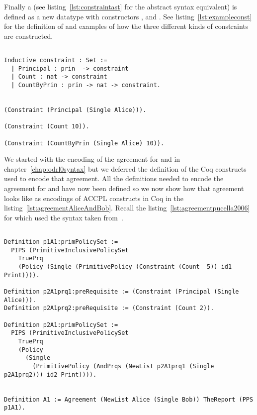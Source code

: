 Finally a  (see  listing~\ref{lst:constraintast} for the abstract syntax equivalent) is defined as a new datatype with constructors ,  and . See listing~\ref{lst:exampleconst} for the definition of  and examples of how the three different kinds of constraints are constructed.

\lstset{language=Coq}
\begin{minipage}[c]{0.95\textwidth}
\begin{lstlisting}[frame=single, caption={Constraint Definition and the Three Kinds of Constraints},label={lst:exampleconst}]

Inductive constraint : Set :=
  | Principal : prin  -> constraint 
  | Count : nat -> constraint 
  | CountByPrin : prin -> nat -> constraint.


(Constraint (Principal (Single Alice))).

(Constraint (Count 10)).

(Constraint (CountByPrin (Single Alice) 10)).

\end{lstlisting}
\end{minipage}


We started with the encoding of the agreement for  and  in chapter~\ref{chap:odrl0syntax} but we deferred the definition of the Coq constructs used to encode that agreement. All the definitions needed to encode the agreement for  and  have now been defined so we now show how that agreement looks like as encodings of \ac{ACCPL} constructs in Coq in the listing~\ref{lst:agreementAliceAndBob}. Recall the listing~\ref{lst:agreementpucella2006} for  which used the syntax taken from~\cite{pucella2006}.



\lstset{language=Coq}
\begin{lstlisting}[frame=single, caption={Agreement for Alice and Bob in ACCPL},label={lst:agreementAliceAndBob}]

Definition p1A1:primPolicySet :=
  PIPS (PrimitiveInclusivePolicySet
    TruePrq
    (Policy (Single (PrimitivePolicy (Constraint (Count  5)) id1 Print)))).

Definition p2A1prq1:preRequisite := (Constraint (Principal (Single Alice))).
Definition p2A1prq2:preRequisite := (Constraint (Count 2)).

Definition p2A1:primPolicySet :=
  PIPS (PrimitiveInclusivePolicySet
    TruePrq
    (Policy 
      (Single 
        (PrimitivePolicy (AndPrqs (NewList p2A1prq1 (Single p2A1prq2))) id2 Print)))).


Definition A1 := Agreement (NewList Alice (Single Bob)) TheReport (PPS p1A1).
\end{lstlisting}	


